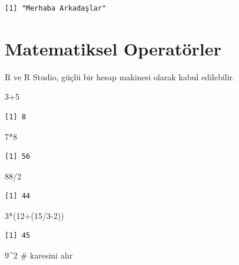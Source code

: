 \documentclass[
  letterpaper,
  DIV=11,
  numbers=noendperiod]{scrreprt}
\newenvironment{Shaded}{\begin{snugshade}}{\end{snugshade}}
\newcommand{\CommentTok}[1]{\textcolor[rgb]{0.37,0.37,0.37}{#1}}
\newcommand{\DecValTok}[1]{\textcolor[rgb]{0.68,0.00,0.00}{#1}}
\newcommand{\NormalTok}[1]{\textcolor[rgb]{0.00,0.23,0.31}{#1}}
\newcommand{\SpecialCharTok}[1]{\textcolor[rgb]{0.37,0.37,0.37}{#1}}
\begin{document}
\begin{verbatim}
[1] "Merhaba Arkadaşlar"
\end{verbatim}

\section{Matematiksel Operatörler}\label{matematiksel-operatuxf6rler}

R ve R Studio, güçlü bir hesap makinesi olarak kabul edilebilir.

\begin{Shaded}
\begin{Highlighting}[]
\DecValTok{3}\SpecialCharTok{+}\DecValTok{5} 
\end{Highlighting}
\end{Shaded}

\begin{verbatim}
[1] 8
\end{verbatim}

\begin{Shaded}
\begin{Highlighting}[]
\DecValTok{7}\SpecialCharTok{*}\DecValTok{8} 
\end{Highlighting}
\end{Shaded}

\begin{verbatim}
[1] 56
\end{verbatim}

\begin{Shaded}
\begin{Highlighting}[]
\DecValTok{88}\SpecialCharTok{/}\DecValTok{2} 
\end{Highlighting}
\end{Shaded}

\begin{verbatim}
[1] 44
\end{verbatim}

\begin{Shaded}
\begin{Highlighting}[]
\DecValTok{3}\SpecialCharTok{*}\NormalTok{(}\DecValTok{12}\SpecialCharTok{+}\NormalTok{(}\DecValTok{15}\SpecialCharTok{/}\DecValTok{3{-}2}\NormalTok{)) }
\end{Highlighting}
\end{Shaded}

\begin{verbatim}
[1] 45
\end{verbatim}

\begin{Shaded}
\begin{Highlighting}[]
\DecValTok{9}\SpecialCharTok{\^{}}\DecValTok{2} \CommentTok{\# karesini alır }
\end{Highlighting}
\end{Shaded}
\end{document}
